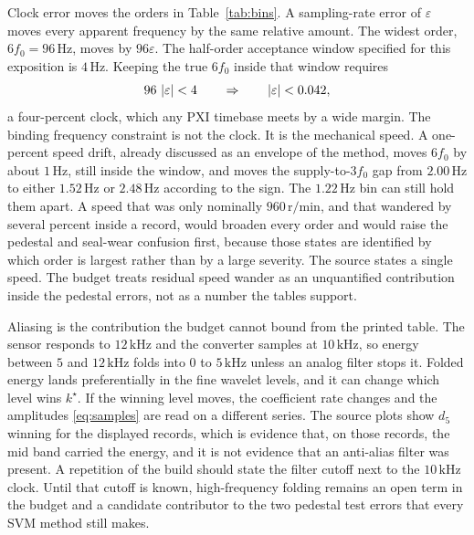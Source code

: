 Clock error moves the orders in Table~\ref{tab:bins}.
A sampling-rate error of \(\varepsilon\) moves every apparent frequency by the same relative amount.
The widest order, \(6f_{0}=96\,\mathrm{Hz}\), moves by \(96\varepsilon\).
The half-order acceptance window specified for this exposition is \(4\,\mathrm{Hz}\).
Keeping the true \(6f_{0}\) inside that window requires
\begin{equation}
96\,\left\lvert \varepsilon \right\rvert<4
\qquad\Rightarrow\qquad
\left\lvert \varepsilon \right\rvert<0.042,
\label{eq:clock}
\end{equation}
a four-percent clock, which any PXI timebase meets by a wide margin.
The binding frequency constraint is not the clock.
It is the mechanical speed.
A one-percent speed drift, already discussed as an envelope of the method, moves \(6f_{0}\) by about \(1\,\mathrm{Hz}\), still inside the window, and moves the supply-to-\(3f_{0}\) gap from \(2.00\,\mathrm{Hz}\) to either \(1.52\,\mathrm{Hz}\) or \(2.48\,\mathrm{Hz}\) according to the sign.
The \(1.22\,\mathrm{Hz}\) bin can still hold them apart.
A speed that was only nominally \(960\,\mathrm{r/min}\), and that wandered by several percent inside a record, would broaden every order and would raise the pedestal and seal-wear confusion first, because those states are identified by which order is largest rather than by a large severity.
The source states a single speed.
The budget treats residual speed wander as an unquantified contribution inside the pedestal errors, not as a number the tables support.

Aliasing is the contribution the budget cannot bound from the printed table.
The sensor responds to \(12\,\mathrm{kHz}\) and the converter samples at \(10\,\mathrm{kHz}\), so energy between \(5\) and \(12\,\mathrm{kHz}\) folds into \(0\) to \(5\,\mathrm{kHz}\) unless an analog filter stops it.
Folded energy lands preferentially in the fine wavelet levels, and it can change which level wins \(k^{\star}\).
If the winning level moves, the coefficient rate changes and the amplitudes \eqref{eq:samples} are read on a different series.
The source plots show \(d_{5}\) winning for the displayed records, which is evidence that, on those records, the mid band carried the energy, and it is not evidence that an anti-alias filter was present.
A repetition of the build should state the filter cutoff next to the \(10\,\mathrm{kHz}\) clock.
Until that cutoff is known, high-frequency folding remains an open term in the budget and a candidate contributor to the two pedestal test errors that every SVM method still makes.

